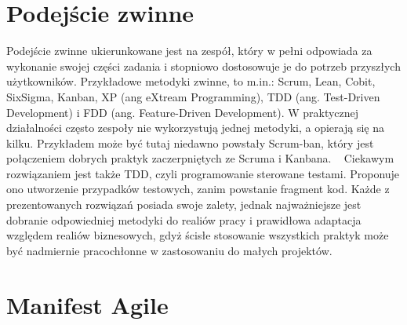 \section{Podejście zwinne}

Podejście zwinne ukierunkowane jest na zespół, który w pełni odpowiada za wykonanie swojej części
zadania i stopniowo dostosowuje je do potrzeb przyszłych użytkowników. Przykładowe metodyki zwinne,
to m.in.: Scrum, Lean, Cobit, SixSigma, Kanban, XP (ang eXtream Programming), TDD (ang. Test-Driven Development)
i FDD (ang. Feature-Driven Development).
W praktycznej działalności często zespoły nie wykorzystują jednej metodyki, a opierają się na kilku.
Przykładem może być tutaj niedawno powstały Scrum-ban, który jest połączeniem dobrych praktyk zaczerpniętych ze Scruma i Kanbana.
~\cite{Wolf_2012} Ciekawym rozwiązaniem jest także TDD, czyli programowanie sterowane testami. Proponuje ono utworzenie przypadków testowych,
zanim powstanie fragment kod.\cite{TDD_2015} 
Każde z prezentowanych rozwiązań posiada swoje zalety,
jednak najważniejsze jest dobranie odpowiedniej metodyki do realiów pracy i prawidłowa adaptacja względem realiów biznesowych,
gdyż ścisłe stosowanie wszystkich praktyk może być nadmiernie pracochłonne w zastosowaniu do małych projektów.

\section{Manifest Agile}

